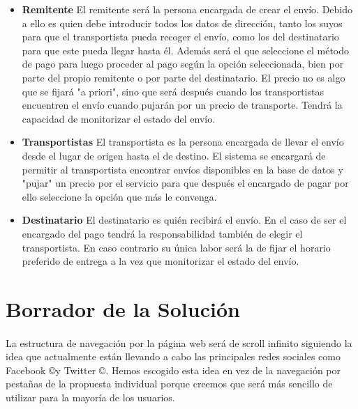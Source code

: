 \documentclass[10pt, a4paper,spanish]{article}
\begin{document}
			\begin{itemize}

				\item{\textbf{Remitente}}
				\newline
				El remitente será la persona encargada de crear el envío. Debido a ello es quien debe introducir todos los datos de dirección, tanto los suyos para que el transportista pueda recoger el envío, como los del destinatario para que este pueda llegar hasta él. Además será el que seleccione el método de pago para luego proceder al pago según la opción seleccionada, bien por parte del propio remitente o por parte del destinatario. El precio no es algo que se fijará "a priori", sino que será después cuando los transportistas encuentren el envío cuando pujarán por un precio de transporte. Tendrá la capacidad de monitorizar el estado del envío.

				\item{\textbf{Transportistas}}
				\newline
				El transportista es la persona encargada de llevar el envío desde el lugar de origen hasta el de destino. El sistema se encargará de permitir al transportista encontrar envíos disponibles en la base de datos y "pujar" un precio por el servicio para que después el encargado de pagar por ello seleccione la opción que más le convenga.

				\item{\textbf{Destinatario}}
				\newline
				El destinatario es quién recibirá el envío. En el caso de ser el encargado del pago tendrá la responsabilidad también de elegir el transportista. En caso contrario su única labor será la de fijar el horario preferido de entrega a la vez que monitorizar el estado del envío.

			\end{itemize}
		\section{Borrador de la Solución}

			\paragraph{}
			La estructura de navegación por la página web será de scroll infinito siguiendo la idea que actualmente están llevando a cabo las principales redes sociales como Facebook \copyright y  Twitter \copyright. Hemos escogido esta idea en vez de la navegación por pestañas de la propuesta individual porque creemos que será más sencillo de utilizar para la mayoría de los usuarios.
\end{document}
